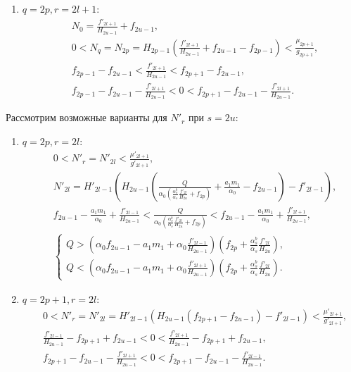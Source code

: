 \begin{enumerate}
    \item \(q=2p, r=2l+1\):
    \begin{align*}
        & N_0 = \frac{f'_{2l+1}}{H_{2u-1}} + f_{2u-1}, \\
        & 0 < N_q = N_{2p} = H_{2p-1} \left( \frac{f'_{2l+1}}{H_{2u-1}} + f_{2u-1} - f_{2p-1} \right) < \frac{\mu_{2p+1}}{g_{2p+1}}, \\
        & f_{2p-1} - f_{2u-1} < \frac{f'_{2l+1}}{H_{2u-1}} < f_{2p+1} - f_{2u-1}, \\
        & f_{2p-1} - f_{2u-1} - \frac{f'_{2l+1}}{H_{2u-1}} < 0 < f_{2p+1} - f_{2u-1} - \frac{f'_{2l+1}}{H_{2u-1}}.
    \end{align*}
\end{enumerate}

Рассмотрим возможные варианты для \(N'_r\) при \(s=2u\):
\begin{enumerate}
    \item \(q=2p, r=2l\):
    \begin{align*}
        & 0 < N'_r = N'_{2l} < \frac{\mu'_{2l+1}}{g'_{2l+1}}, \\
        & N'_{2l} = H'_{2l-1} \left( H_{2u-1} \left( \frac{Q}{\alpha_0 \left( \frac{\alpha^b_s}{\alpha_s} \frac{f'_{2l}}{H_{2u}} + f_{2p} \right)} + \frac{a_1 m_1}{\alpha_0} - f_{2u-1} \right) - f'_{2l-1} \right), \\
        & f_{2u-1} - \frac{a_1 m_1}{\alpha_0} + \frac{f'_{2l-1}}{H_{2u-1}} < \frac{Q}{\alpha_0 \left( \frac{\alpha^b_s}{\alpha_s} \frac{f'_{2l}}{H_{2u}} + f_{2p} \right)} < f_{2u-1} - \frac{a_1 m_1}{\alpha_0} + \frac{f'_{2l+1}}{H_{2u-1}}, \\
        & \begin{cases}
            Q > \left( \alpha_0 f_{2u-1} - a_1 m_1 + \alpha_0 \frac{f'_{2l-1}}{H_{2u-1}} \right) \left( f_{2p} + \frac{\alpha^b_s}{\alpha_s} \frac{f'_{2l}}{H_{2u}} \right), \\
            Q < \left( \alpha_0 f_{2u-1} - a_1 m_1 + \alpha_0 \frac{f'_{2l+1}}{H_{2u-1}} \right) \left( f_{2p} + \frac{\alpha^b_s}{\alpha_s} \frac{f'_{2l}}{H_{2u}} \right).
        \end{cases}
    \end{align*}

    \item \(q=2p+1, r=2l\):
    \begin{align*}
        & 0 < N'_{r} = N'_{2l} = H'_{2l-1} \left( H_{2u-1} \left( f_{2p+1} - f_{2u-1} \right) - f'_{2l-1} \right) < \frac{\mu'_{2l+1}}{g'_{2l+1}}, \\
        & \frac{f'_{2l-1}}{H_{2u-1}} - f_{2p+1} + f_{2u-1} < 0 < \frac{f'_{2l+1}}{H_{2u-1}} - f_{2p+1} + f_{2u-1}, \\
        & f_{2p+1} - f_{2u-1} - \frac{f'_{2l+1}}{H_{2u-1}} < 0 < f_{2p+1} - f_{2u-1} - \frac{f'_{2l-1}}{H_{2u-1}}.
    \end{align*}


\end{enumerate}
